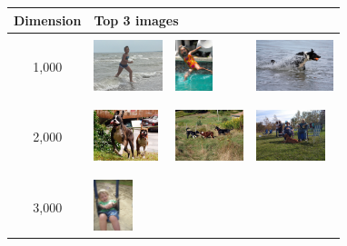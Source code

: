  \begin{figure}
   \centering
   \begin{tabular}{c|lll}
     {\bf Dimension} & \multicolumn{3}{l}{\bf Top 3 images} \\\hline & & & \\
     1,000
     & \includegraphics[height=1.5cm]{chapters/TAL/flickr8k/2726262796_03bd63a155.jpg}
     & \includegraphics[height=1.5cm]{chapters/TAL/flickr8k/497122685_a51b29dc46.jpg}
     & \includegraphics[height=1.5cm]{chapters/TAL/flickr8k/3515904775_f8acc5909e.jpg}
     \\
     & & & \\
     \hline
     & & & \\
     2,000
     & \includegraphics[height=1.5cm]{chapters/TAL/flickr8k/255741044_1102982213.jpg}
     & \includegraphics[height=1.5cm]{chapters/TAL/flickr8k/1388970365_162edcceb4.jpg}
     & \includegraphics[height=1.5cm]{chapters/TAL/flickr8k/3053813297_7ce5f87710.jpg}
     \\
     & & & \\
     \hline
     & & & \\
     3,000
     & \includegraphics[height=1.5cm]{chapters/TAL/flickr8k/2362481035_a7600875d0.jpg}

\end{tabular}
\end{figure}
